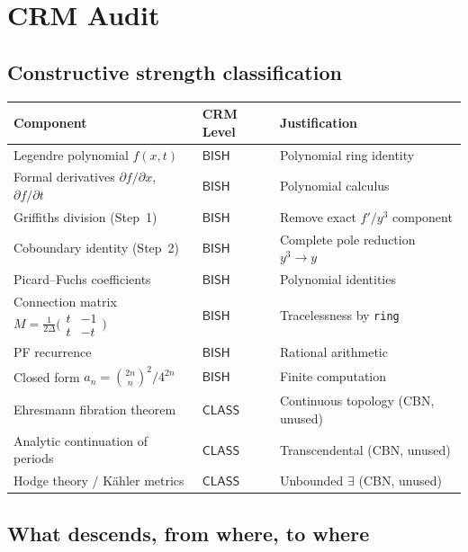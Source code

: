 \documentclass[11pt]{article}
\theoremstyle{plain}
\theoremstyle{definition}
\theoremstyle{remark}
\newcommand{\BISH}{\mathsf{BISH}}
\newcommand{\CLASS}{\mathsf{CLASS}}
\begin{document}
\section{CRM Audit}\label{sec:crm}

\subsection{Constructive strength classification}

\begin{center}
\begin{tabular}{lll}
\toprule
\textbf{Component} & \textbf{CRM Level} & \textbf{Justification} \\
\midrule
Legendre polynomial $f(x,t)$ & $\BISH$ & Polynomial ring identity \\
Formal derivatives $\partial f/\partial x$, $\partial f/\partial t$
  & $\BISH$ & Polynomial calculus \\
Griffiths division (Step~1) & $\BISH$ & Remove exact $f'/y^3$ component \\
Coboundary identity (Step~2) & $\BISH$ & Complete pole reduction $y^3 \to y$ \\
Picard--Fuchs coefficients & $\BISH$ & Polynomial identities \\
Connection matrix $M = \frac{1}{2\Delta}\bigl(\begin{smallmatrix}t & -1\\t & -t\end{smallmatrix}\bigr)$ & $\BISH$ & Tracelessness by \texttt{ring} \\
PF recurrence & $\BISH$ & Rational arithmetic \\
Closed form $a_n = \binom{2n}{n}^2/4^{2n}$ & $\BISH$ & Finite computation \\
\midrule
Ehresmann fibration theorem & $\CLASS$ & Continuous topology (CBN, unused) \\
Analytic continuation of periods & $\CLASS$ & Transcendental (CBN, unused) \\
Hodge theory / K\"ahler metrics & $\CLASS$ & Unbounded $\exists$ (CBN, unused) \\
\bottomrule
\end{tabular}
\end{center}

\subsection{What descends, from where, to where}
\end{document}
